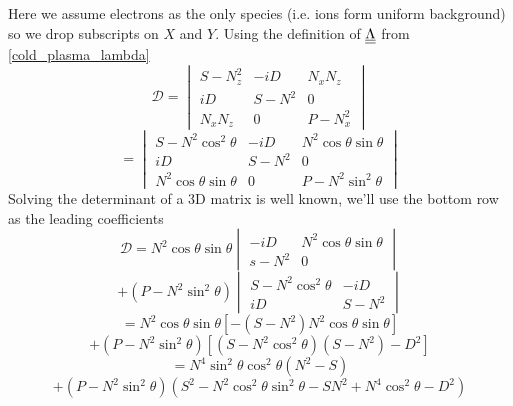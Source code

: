 Here we assume electrons as the only species (i.e. ions form uniform background) so we drop subscripts on $X$ and $Y$. Using the definition of $\underline{\underline{\Lambda}}$ from \eqref{cold_plasma_lambda}
\begin{equation*}
	\mathcal{D} = \begin{vmatrix}
		S - N_z^2 & -iD & N_x N_z \\
		iD & S - N^2 & 0 \\
		N_x N_z & 0 & P - N_x^2
	\end{vmatrix}
\end{equation*}
\begin{equation}
	= \begin{vmatrix}
		S - N^2 \cos^2 \theta & -iD & N^2 \cos \theta \sin \theta \\
		iD & S - N^2 & 0 \\
		N^2 \cos \theta \sin \theta & 0 & P - N^2 \sin^2 \theta
	\end{vmatrix}
\end{equation}
Solving the determinant of a 3D matrix is well known, we'll use the bottom row as the leading coefficients
\begin{equation*}
	\mathcal{D} = N^2 \cos \theta \sin \theta
	\begin{vmatrix}
		-iD & N^2 \cos \theta \sin \theta \\
		s - N^2 & 0
	\end{vmatrix}
\end{equation*}
\begin{equation*}
+ \left(P - N^2 \sin^2 \theta\right)
\begin{vmatrix}
	S - N^2 \cos^2 \theta & -iD \\
	iD & S - N^2
\end{vmatrix}
\end{equation*}
\begin{equation*}
	= N^2 \cos \theta \sin \theta \left[ - \left( S - N^2 \right) N^2 \cos \theta \sin \theta \right]
\end{equation*}
\begin{equation*}
	+ \left(P - N^2 \sin^2 \theta\right) \left[ \left( S - N^2 \cos^2 \theta \right) \left( S - N^2 \right) - D^2 \right]
\end{equation*}
\begin{equation*}
	= N^4 \sin^2 \theta \cos^2 \theta \left(N^2 - S\right)
\end{equation*}
\begin{equation*}
	+ \left(P - N^2 \sin^2 \theta \right) \left( S^2 - N^2 \cos^2 \theta \sin^2 \theta - S N^2 + N^4 \cos^2 \theta - D^2 \right)
\end{equation*}
